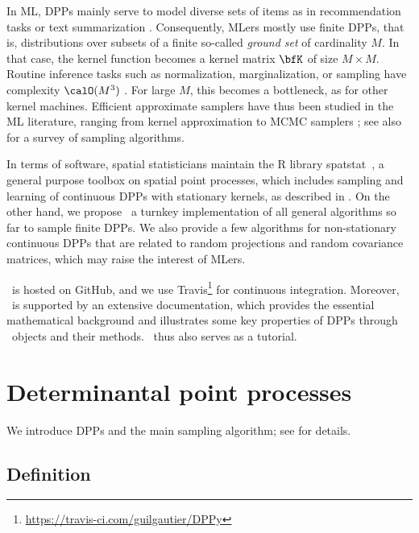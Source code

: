 \documentclass[twoside,11pt]{article}
\begin{document}
  In ML, DPPs mainly serve to model diverse sets of items as in recommendation tasks \citep{KaDeKo16, GaPaKo16} or text summarization \citep{DuBa18}. Consequently, MLers mostly use finite DPPs, that is, distributions over subsets of a finite so-called \emph{ground set} of cardinality $M$.
  In that case, the kernel function becomes a kernel matrix $\bfK$ of size $M\times M$.
  Routine inference tasks such as normalization, marginalization, or sampling have complexity $\calO(M^3)$ \citep{KuTa12}.
  For large $M$, this becomes a bottleneck, as for other kernel machines. Efficient approximate samplers have thus been studied in the ML literature, ranging from kernel approximation \citep{AKFT13} to MCMC samplers \citep{AnGhRe16, LiJeSr16c, GaBaVa17}; see also \citet{TrBaAm18} for a survey of sampling algorithms.

  In terms of software, spatial statisticians maintain the R library \textsf{spatstat}\ \citep{BaTu05}, a general purpose toolbox on spatial point processes, which includes sampling and learning of continuous DPPs with stationary kernels, as described in \cite{LaMoRu15}. On the other hand, we propose \DPPy\, a turnkey implementation of all general algorithms so far to sample finite DPPs. We also provide a few algorithms for non-stationary continuous DPPs that are related to random projections and random covariance matrices, which may raise the interest of MLers.

  \setcounter{footnote}{5}
  \DPPy\ is hosted on GitHub, and we use Travis\footnote{\url{https://travis-ci.com/guilgautier/DPPy}} for continuous integration. %
  Moreover, \DPPy\ is supported by an extensive documentation, which provides the essential mathematical background and illustrates some key properties of DPPs through \DPPy\ objects and their methods. \DPPy\ thus also serves as a tutorial.


\section{Determinantal point processes} %
\label{sec:determinantal_point_processes}

	We introduce DPPs and the main sampling algorithm; see \citep{HKPV06} for details.

  \subsection{Definition} %
  \label{sub:definition}
\end{document}

